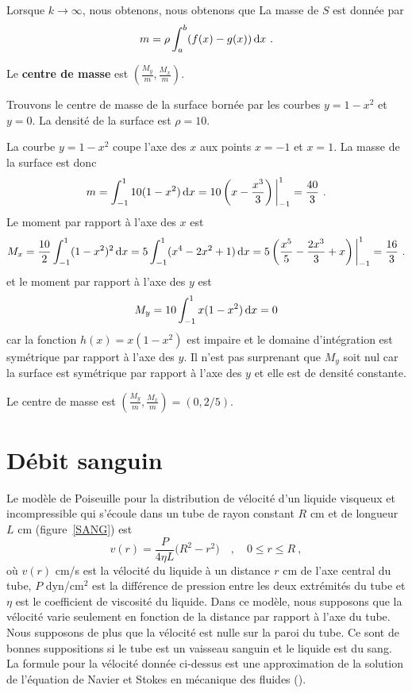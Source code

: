 {Lorsque $k\to \infty$, nous obtenons, nous obtenons que La masse de
$S$ est donnée par
\[
m = \rho \int_a^b (f(x)-g(x)) \,\mathrm{d}x \ .
\]

Le {\bfseries centre de masse} est
$\displaystyle \left( \frac{M_y}{m} , \frac{M_x}{m}\right)$.

\begin{egg}
Trouvons le centre de masse de la surface bornée par les courbes $y=1-x^2$ et
$y=0$.  La densité de la surface est $\rho = 10$.

La courbe $y=1-x^2$ coupe l'axe des $x$ aux points $x=-1$ et $x=1$.
La masse de la surface est donc
\[
m = \int_{-1}^1 10(1-x^2) \,\mathrm{d}x = 10
\left( x - \frac{x^3}{3}\right)\bigg|_{-1}^1 = \frac{40}{3} \ .
\]
Le moment par rapport à l'axe des $x$ est
\[
M_x = \frac{10}{2}  \int_{-1}^1 (1-x^2)^2 \,\mathrm{d}x
= 5 \int_{-1}^1 (x^4 - 2x^2 + 1) \,\mathrm{d}x
= 5\left( \frac{x^5}{5} - \frac{2x^3}{3} + x \right)\bigg|_{-1}^1
= \frac{16}{3} \ .
\]
et le moment par rapport à l'axe des $y$ est
\[
M_y = 10 \int_{-1}^1 x(1-x^2) \,\mathrm{d}x = 0
\]
car la fonction $h(x) = x(1-x^2)$ est impaire et le domaine d'intégration
est symétrique par rapport à l'axe des $y$.  Il n'est pas surprenant que
$M_y$ soit nul car la surface est symétrique par rapport à l'axe des
$y$ et elle est de densité constante.

Le centre de masse est
$\displaystyle \left(\frac{M_y}{m},\frac{M_x}{m}\right) = (0, 2/5)$.
\end{egg}

\section{Débit sanguin \life}

Le modèle de Poiseuille pour la distribution de vélocité d'un liquide visqueux
et incompressible qui s'écoule dans un tube de rayon constant $R$ cm et de
longueur $L$ cm (figure~\ref{SANG}) est
\[
v(r) = \frac{P}{4\eta L}\big( R^2-r^2\big) \quad , \quad 0 \leq r \leq R \ ,
\]
où $v(r)$ cm/s est la vélocité du liquide à un distance $r$ cm de l'axe
central du tube, $P$ dyn/cm$^2$ est la différence de pression entre les
deux extrémités du tube et $\eta$ est le coefficient de viscosité du liquide.
Dans ce modèle, nous supposons que la vélocité varie seulement en fonction de la
distance par rapport à l'axe du tube.  Nous supposons de plus que la
vélocité est nulle sur la paroi du tube.  Ce sont de bonnes
suppositions si le tube est un vaisseau sanguin et le liquide est du
sang.  La formule pour la vélocité donnée ci-dessus est une
approximation de la solution de l'équation de Navier et Stokes en
mécanique des fluides (\cite{BE}).

}
